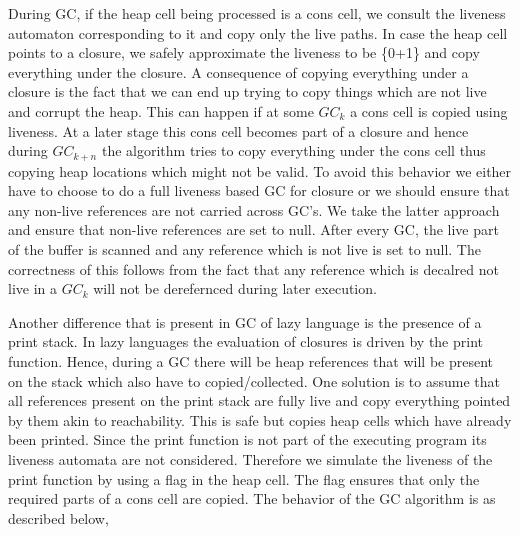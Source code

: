 \documentclass[9pt]{sigplanconf}
\newcommand{\comment}[1]{{\color{Myblue}{(#1)}}}
\begin{document}
\begin{enumerate}
\comment{Mention the fact that liveness at a program point indicates
  what references will be used by the program eventually. The exact
  point where a reference will be used cannot be determined statically
due to the language being lazy. }
During GC, if the heap cell being processed is a cons cell, we consult
the  liveness automaton  corresponding to  it and  copy only  the live
paths.  In  case  the  heap  cell  points  to  a  closure,  we  safely
approximate the  liveness to be {\{0+1\}\*} and  copy everything under
the closure.
A consequence of  copying everything under a closure  is the fact that
we can end up trying to copy things which are not live and corrupt the
heap. This  can happen if at some  $GC_k$ a cons cell  is copied using
liveness. At  a later stage this  cons cell becomes part  of a closure
and  hence during $GC_{k+n}$  the algorithm  tries to  copy everything
under the  cons cell  thus copying heap  locations which might  not be
valid.  To avoid  this behavior we either have to choose  to do a full
liveness based  GC for closure or  we should ensure  that any non-live
references are  not carried across  GC's. We take the  latter approach
and ensure that  non-live references are set to  null. After every GC,
the live part of the buffer  is scanned and any reference which is not
live is  set to null.  The correctness of  this follows from  the fact
that any reference which is decalred  not live in a $GC_k$ will not be
derefernced during later execution.


Another  difference that is  present in  GC of  lazy language  is the
presence  of  a print  stack.  In  lazy  languages the  evaluation  of
closures is  driven by the print  function\comment{Refer to SPJ's book}.  Hence, during  a GC there
will be heap  references that will be present on  the stack which also
have  to  copied/collected.   One  solution  is  to  assume  that  all
references  present  on  the  print  stack are  fully  live  and  copy
everything pointed  by them  akin to reachability.   This is  safe but
copies heap  cells which  have already been  printed. Since  the print
function is  not part of  the executing program its  liveness automata
are not  considered. Therefore we  simulate the liveness of  the print
function by using a flag in  the heap cell. The flag ensures that only
the required parts  of a cons cell are copied. The  behavior of the GC
algorithm is as described below,


\end{enumerate}
\end{document}
